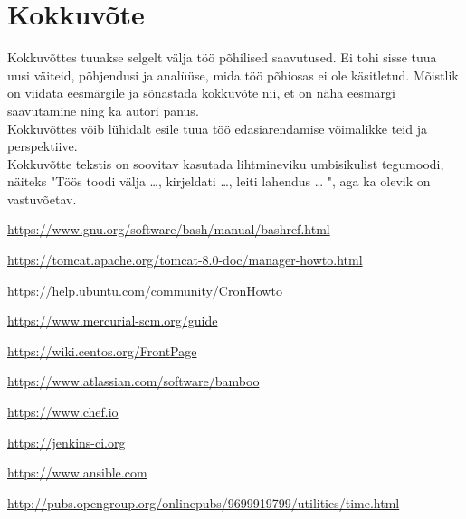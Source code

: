 \documentclass[12pt]{report}
\begin{document}
  \newpage
  
  \section*{Kokkuvõte}
  \label{kokkuvote}

Kokkuvõttes tuuakse selgelt välja töö põhilised saavutused. Ei tohi sisse tuua uusi väiteid, põhjendusi ja analüüse, mida töö põhiosas ei ole käsitletud. Mõistlik on viidata eesmärgile ja sõnastada kokkuvõte nii, et on näha eesmärgi saavutamine ning ka autori panus.\\

Kokkuvõttes võib lühidalt esile tuua töö edasiarendamise võimalikke teid ja perspektiive.\\

Kokkuvõtte tekstis on soovitav kasutada lihtmineviku umbisikulist tegumoodi, näiteks "Töös toodi välja …, kirjeldati …, leiti lahendus … ", aga ka olevik on vastuvõetav.

  \newpage
  
  \begin{thebibliography}{9}
    \label{kasutatud-materjalid}
  
    \url{https://www.gnu.org/software/bash/manual/bashref.html}
    
    \url{https://tomcat.apache.org/tomcat-8.0-doc/manager-howto.html}
  
    \url{https://help.ubuntu.com/community/CronHowto}
  
    \url{https://www.mercurial-scm.org/guide}
  
    \url{https://wiki.centos.org/FrontPage}
  
    \url{https://www.atlassian.com/software/bamboo}
  
    \url{https://www.chef.io}
  
    \url{https://jenkins-ci.org}
  
    \url{https://www.ansible.com}
    
    \url{http://pubs.opengroup.org/onlinepubs/9699919799/utilities/time.html}
 
  \end{thebibliography}
\end{document}
